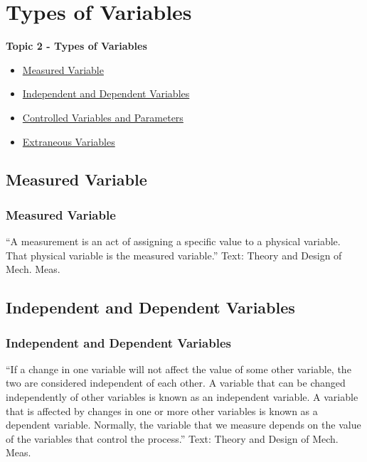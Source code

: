 \documentclass[fleqn]{beamer} %
\newcommand{\sectionIItitle}{Types of Variables}
\newcommand{\sectionIIsubsectionItitle}{Measured Variable}
\newcommand{\sectionIIsubsectionIItitle}{Independent and Dependent Variables}
\newcommand{\sectionIIsubsectionIIItitle}{Controlled Variables and Parameters}
\newcommand{\sectionIIsubsectionIVtitle}{Extraneous Variables}
\begin{document}
	\section{\sectionIItitle}\label{sectionII}

		\begin{frame}
			\large \textbf{Topic 2 - \sectionIItitle} \vspace{3mm}\\

			\begin{itemize}
				\item \hyperlink{sectionIIsubsectionI}{\sectionIIsubsectionItitle} \vspc %
				\item \hyperlink{sectionIIsubsectionII}{\sectionIIsubsectionIItitle} \vspc %
				\item \hyperlink{sectionIIsubsectionIII}{\sectionIIsubsectionIIItitle} \vspc %
				\item \hyperlink{sectionIIsubsectionIV}{\sectionIIsubsectionIVtitle} \vspc %
			\end{itemize}
		\end{frame}

		\subsection{\sectionIIsubsectionItitle}\label{sectionIIsubsectionI}

			\begin{frame}[label=sectionIIsubsectionI]
				\frametitle{\sectionIIsubsectionItitle}

				\large{``A {\BL measurement} is an act of assigning a specific value to a physical variable. That physical variable
				is the {\GR measured variable}.''} \vspc
				{\tiny Text: Theory and Design of Mech. Meas.}

			\end{frame}

		\subsection{\sectionIIsubsectionIItitle}\label{sectionIIsubsectionII}

			\begin{frame}
				\frametitle{\sectionIIsubsectionIItitle}

				{``If a change in one variable will not affect the value of some other variable, the
				two are considered independent of each other. A variable that can be changed independently of other
				variables is known as an {\PR independent variable}. A variable that is affected by changes in one or more
				other variables is known as a {\BR dependent variable}. Normally, the variable that we measure depends on
				the value of the variables that control the process.''} \vspc
				{\tiny Text: Theory and Design of Mech. Meas.}

			\end{frame}
\end{document}
